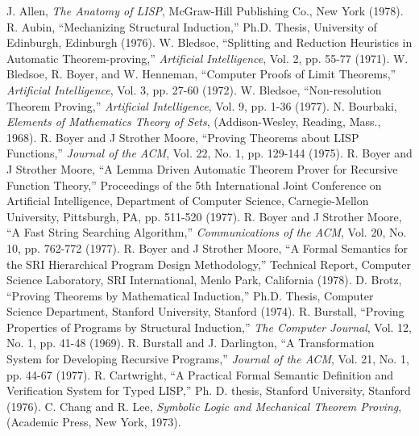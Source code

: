\documentclass[11pt]{book}
\newcommand{\pubinlineunderline}[1]{\emph{#1}}
\begin{document}
\begin{thebibliography}{99}
 J. Allen, \pubinlineunderline{The Anatomy of LISP}, McGraw-Hill Publishing Co., New York (1978).
 R. Aubin, ``Mechanizing Structural Induction,'' Ph.D. Thesis, University of Edinburgh, Edinburgh (1976).
 W. Bledsoe, ``Splitting and Reduction Heuristics in Automatic Theorem-proving,'' \pubinlineunderline{Artificial Intelligence}, Vol. 2, pp. 55-77 (1971).
 W. Bledsoe, R. Boyer, and W. Henneman,  ``Computer Proofs of Limit Theorems,'' \pubinlineunderline{Artificial Intelligence}, Vol. 3, pp. 27-60 (1972).
 W. Bledsoe, ``Non-resolution Theorem Proving,'' \pubinlineunderline{Artificial Intelligence}, Vol. 9, pp. 1-36 (1977).
 N. Bourbaki, \pubinlineunderline{Elements of Mathematics Theory of Sets}, (Addison-Wesley, Reading, Mass., 1968).
 R. Boyer and J Strother Moore, ``Proving Theorems about LISP Functions,'' \pubinlineunderline{Journal of the ACM}, Vol. 22, No. 1, pp. 129-144 (1975).
 R. Boyer and J Strother Moore, ``A Lemma Driven Automatic Theorem Prover for Recursive Function Theory,'' Proceedings of the 5th International Joint Conference on Artificial Intelligence, Department of Computer Science, Carnegie-Mellon University, Pittsburgh, PA, pp. 511-520 (1977).
 R. Boyer and J Strother Moore, ``A Fast String Searching Algorithm,'' \pubinlineunderline{Communications of the ACM}, Vol. 20, No. 10, pp. 762-772 (1977).
 R. Boyer and J Strother Moore, ``A Formal Semantics for the SRI Hierarchical Program Design Methodology,'' Technical Report, Computer Science Laboratory, SRI International, Menlo Park, California (1978).
 D. Brotz, ``Proving Theorems by Mathematical Induction,'' Ph.D. Thesis, Computer Science Department, Stanford University, Stanford (1974).
 R.  Burstall, ``Proving Properties of Programs by Structural Induction,'' \pubinlineunderline{The Computer Journal}, Vol. 12, No. 1, pp. 41-48 (1969).
 R. Burstall and J. Darlington, ``A Transformation System for Developing Recursive Programs,'' \pubinlineunderline{Journal of the ACM}, Vol. 21, No. 1, pp. 44-67 (1977).
 R. Cartwright, ``A Practical Formal Semantic Definition and Verification System for Typed LISP,'' Ph. D. thesis, Stanford University, Stanford (1976).
 C. Chang and R. Lee, \pubinlineunderline{Symbolic Logic and Mechanical Theorem Proving}, (Academic Press, New York, 1973).

\end{thebibliography}
\end{document}
